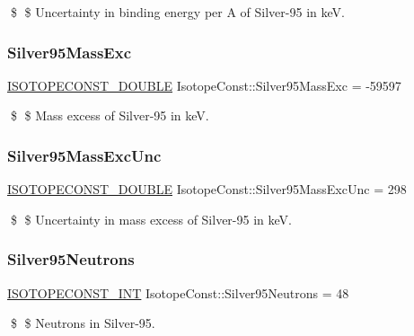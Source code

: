 \$ \$ Uncertainty in binding energy per A of Silver-\/95 in keV. \mbox{\label{group___isotope_const-_silver-_ag95_ga478cf77e45d9210f296a4a8081ef9aca}} 
\subsubsection{\texorpdfstring{Silver95\+Mass\+Exc}{Silver95MassExc}}
{\footnotesize\ttfamily \mbox{\hyperlink{group___isotope_const-_macros_ga8f45a7272ce02c0b4c65c44636ed719a}{I\+S\+O\+T\+O\+P\+E\+C\+O\+N\+S\+T\+\_\+\+D\+O\+U\+B\+LE}} Isotope\+Const\+::\+Silver95\+Mass\+Exc = -\/59597}

\$ \$ Mass excess of Silver-\/95 in keV. \mbox{\label{group___isotope_const-_silver-_ag95_ga23f25022670dd4210471d18977de1a53}} 
\subsubsection{\texorpdfstring{Silver95\+Mass\+Exc\+Unc}{Silver95MassExcUnc}}
{\footnotesize\ttfamily \mbox{\hyperlink{group___isotope_const-_macros_ga8f45a7272ce02c0b4c65c44636ed719a}{I\+S\+O\+T\+O\+P\+E\+C\+O\+N\+S\+T\+\_\+\+D\+O\+U\+B\+LE}} Isotope\+Const\+::\+Silver95\+Mass\+Exc\+Unc = 298}

\$ \$ Uncertainty in mass excess of Silver-\/95 in keV. \mbox{\label{group___isotope_const-_silver-_ag95_ga6f4bfda65e8c0f7303635035443b0e18}} 
\subsubsection{\texorpdfstring{Silver95\+Neutrons}{Silver95Neutrons}}
{\footnotesize\ttfamily \mbox{\hyperlink{group___isotope_const-_macros_ga5f18360b3e99483a35c32d789e62621c}{I\+S\+O\+T\+O\+P\+E\+C\+O\+N\+S\+T\+\_\+\+I\+NT}} Isotope\+Const\+::\+Silver95\+Neutrons = 48}

\$ \$ Neutrons in Silver-\/95. \mbox{\label{group___isotope_const-_silver-_ag95_gada07e968bb2488e166866277c319266f}} 
